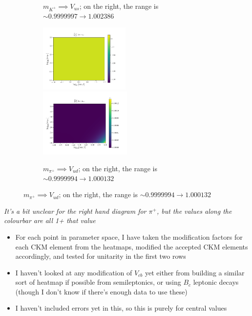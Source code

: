 \documentclass[11pt]{article}
\begin{document}
\begin{figure}[H]
\begin{subfigure}[b]{\textwidth}
        \caption{$m_{K^+} \implies V_{us}$; on the right, the range is $\sim0.9999997\to1.002386$}
    \end{subfigure}
    \begin{subfigure}[b]{\textwidth}
        \includegraphics[width=0.49\textwidth]{heatmaps/mpi-rH0.png}
        \includegraphics[width=0.5\textwidth]{heatmaps/mpi-rH1.png}
        \caption{$m_{\pi^+} \implies V_{ud}$; on the right, the range is $\sim0.9999994\to1.000132$}
    \end{subfigure}
\end{figure}
\textit{It's a bit unclear for the right hand diagram for $\pi^+$, but the values along the colourbar are all 1+ that value}

\newpage
\begin{itemize}
    \item For each point in parameter space, I have taken the modification factors for each CKM element from the heatmaps, modified the accepted CKM elements accordingly, and tested for unitarity in the first two rows
    \item I haven't looked at any modification of $V_{cb}$ yet either from building a similar sort of heatmap if possible from semileptonics, or using $B_c$ leptonic decays (though I don't know if there's enough data to use these)
    \item I haven't included errors yet in this, so this is purely for central values
\end{itemize}
\end{document}
